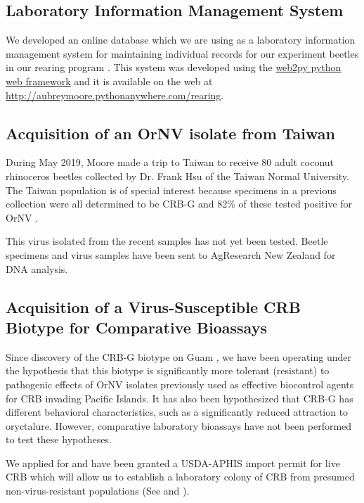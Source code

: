 \documentclass[12pt,letterpaper,english,bibliography=totocnumbered]{scrartcl}
\begin{document}
\subsection{Laboratory Information Management System}\label{lims}

We developed an online database which we are using as a laboratory information management system for maintaining individual records for our experiment beetles in our rearing program \cite{moore_coconut_2019-1}. This system was developed using the \href{http://www.web2py.com/}{web2py python web framework} and it is available on the web at \url{http://aubreymoore.pythonanywhere.com/rearing}. 

\subsection{Acquisition of an OrNV isolate from Taiwan}

During May 2019, Moore made a trip to Taiwan to receive 80 adult coconut rhinoceros
beetles collected by Dr. Frank Hsu of the Taiwan Normal University. The Taiwan population is of special interest because specimens in a previous collection
were all determined to be CRB-G and 82\% of these tested positive for OrNV \cite{watanabe_survey_2016-1}.

This virus isolated from the recent samples has not yet been tested. Beetle specimens and virus samples have been sent to AgResearch New Zealand for DNA analysis.

\subsection{Acquisition of a Virus-Susceptible CRB Biotype for Comparative Bioassays}

Since discovery of the CRB-G biotype on Guam \cite{marshall_new_2017-1}, we have been operating under the hypothesis that this biotype is significantly more tolerant (resistant) to pathogenic effects of OrNV isolates previously used as effective biocontrol agents for CRB invading Pacific Islands. It has also been hypothesized that CRB-G has different behavioral characteristics, such as a significantly reduced attraction to oryctalure. However, comparative laboratory bioassays have not been performed to test these hypotheses.

We applied for and have been granted a USDA-APHIS import permit for live CRB which will allow us to establish a laboratory colony of CRB from presumed non-virus-resistant populations (See \cite{moore_additional_2019} and \cite{usda-aphis_crb_2019}). 
\end{document}

